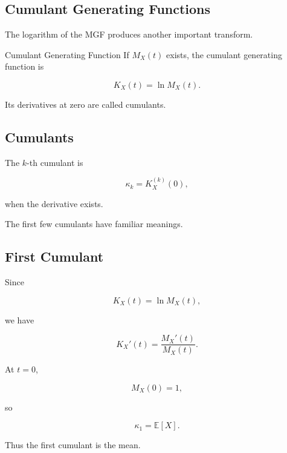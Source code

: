 \subsection{Cumulant Generating Functions}
\label{subsec:cumulant-generating-functions}

The logarithm of the MGF produces another important transform.

\begin{definitionbox}{Cumulant Generating Function}
If \(M_X(t)\) exists, the cumulant generating function is

\[
\boxed{
K_X(t)
=
\ln M_X(t).
}
\]
\end{definitionbox}

Its derivatives at zero are called cumulants.

\subsection{Cumulants}
\label{subsec:cumulants}

The \(k\)-th cumulant is

\[
\boxed{
\kappa_k
=
K_X^{(k)}(0),
}
\]

when the derivative exists.

The first few cumulants have familiar meanings.

\subsection{First Cumulant}
\label{subsec:first-cumulant}

Since

\[
K_X(t)
=
\ln M_X(t),
\]

we have

\[
K_X'(t)
=
\frac{
M_X'(t)
}{
M_X(t)
}.
\]

At \(t=0\),

\[
M_X(0)=1,
\]

so

\[
\boxed{
\kappa_1
=
\mathbb{E}[X].
}
\]

Thus the first cumulant is the mean.

